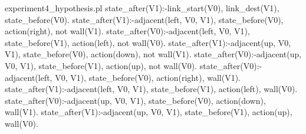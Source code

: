 \begin{filecontents*}{experiment4_hypothesis.pl}
state_after(V1):-link_start(V0), link_dest(V1), 
                 state_before(V0).
state_after(V1):-adjacent(left, V0, V1), state_before(V0), 
                 action(right), not wall(V1).
state_after(V0):-adjacent(left, V0, V1), state_before(V1), 
                 action(left), not wall(V0).
state_after(V1):-adjacent(up, V0, V1), state_before(V0), 
                 action(down), not wall(V1).
state_after(V0):-adjacent(up, V0, V1), state_before(V1), 
                 action(up), not wall(V0).
state_after(V0):-adjacent(left, V0, V1), state_before(V0), 
                 action(right), wall(V1).
state_after(V1):-adjacent(left, V0, V1), state_before(V1), 
                 action(left), wall(V0).
state_after(V0):-adjacent(up, V0, V1), state_before(V0), 
                 action(down), wall(V1).
state_after(V1):-adjacent(up, V0, V1), state_before(V1), 
                 action(up), wall(V0).  
\end{filecontents*}